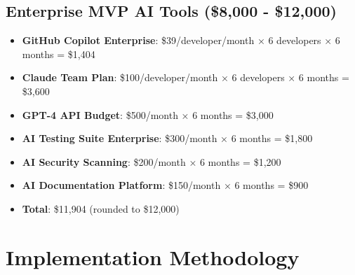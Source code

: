 \documentclass[12pt,a4paper]{report}
\begin{document}
\subsection{Enterprise MVP AI Tools (\$8,000 - \$12,000)}
\begin{itemize}
    \item \textbf{GitHub Copilot Enterprise}: \$39/developer/month × 6 developers × 6 months = \$1,404
    \item \textbf{Claude Team Plan}: \$100/developer/month × 6 developers × 6 months = \$3,600
    \item \textbf{GPT-4 API Budget}: \$500/month × 6 months = \$3,000
    \item \textbf{AI Testing Suite Enterprise}: \$300/month × 6 months = \$1,800
    \item \textbf{AI Security Scanning}: \$200/month × 6 months = \$1,200
    \item \textbf{AI Documentation Platform}: \$150/month × 6 months = \$900
    \item \textbf{Total}: \$11,904 (rounded to \$12,000)
\end{itemize}

\section{Implementation Methodology}
\end{document}
